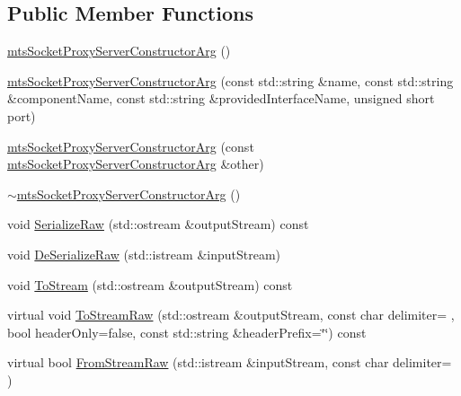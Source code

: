 \subsection*{Public Member Functions}
\begin{DoxyCompactItemize}
\item 
\hyperlink{classmts_socket_proxy_server_constructor_arg_ade6504eac445f0a3f9e8546954e60d3d}{mts\+Socket\+Proxy\+Server\+Constructor\+Arg} ()
\item 
\hyperlink{classmts_socket_proxy_server_constructor_arg_abe971cd2f14fd38f5b49988394242de7}{mts\+Socket\+Proxy\+Server\+Constructor\+Arg} (const std\+::string \&name, const std\+::string \&component\+Name, const std\+::string \&provided\+Interface\+Name, unsigned short port)
\item 
\hyperlink{classmts_socket_proxy_server_constructor_arg_a8c95c6b5cc04b878a91199ff8676506c}{mts\+Socket\+Proxy\+Server\+Constructor\+Arg} (const \hyperlink{classmts_socket_proxy_server_constructor_arg}{mts\+Socket\+Proxy\+Server\+Constructor\+Arg} \&other)
\item 
\hyperlink{classmts_socket_proxy_server_constructor_arg_a156ced3aa467a81cf1b08069263a3b11}{$\sim$mts\+Socket\+Proxy\+Server\+Constructor\+Arg} ()
\item 
void \hyperlink{classmts_socket_proxy_server_constructor_arg_a59d8dec596dad818c0d64545abb66982}{Serialize\+Raw} (std\+::ostream \&output\+Stream) const 
\item 
void \hyperlink{classmts_socket_proxy_server_constructor_arg_a1c85c0b745251f22a54e5b1a635709f1}{De\+Serialize\+Raw} (std\+::istream \&input\+Stream)
\item 
void \hyperlink{classmts_socket_proxy_server_constructor_arg_a086c748c8cfbbe3ae3e4d3daf7125bd7}{To\+Stream} (std\+::ostream \&output\+Stream) const 
\item 
virtual void \hyperlink{classmts_socket_proxy_server_constructor_arg_a3555d9c68b3ce38590adc22c3e0d2755}{To\+Stream\+Raw} (std\+::ostream \&output\+Stream, const char delimiter= \textquotesingle{} \textquotesingle{}, bool header\+Only=false, const std\+::string \&header\+Prefix=\char`\"{}\char`\"{}) const 
\item 
virtual bool \hyperlink{classmts_socket_proxy_server_constructor_arg_ab7ef7061b9cc12774b00c35321fe41b9}{From\+Stream\+Raw} (std\+::istream \&input\+Stream, const char delimiter= \textquotesingle{} \textquotesingle{})
\end{DoxyCompactItemize}
